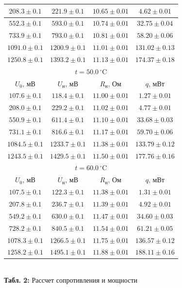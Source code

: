 \documentclass[12pt,a4paper]{scrartcl}
\begin{document}
\begin{center}
\begin{tabular}{|c|c|c|c|}
			\\\hline
			$208.3 \pm 0.1$ & $221.9 \pm 0.1$ & $10.65 \pm 0.01$ & $4.62 \pm 0.01$
			\\\hline
			$552.3 \pm 0.1$ & $593.0 \pm 0.1$ & $10.74 \pm 0.01$ & $32.75 \pm 0.04$
			\\\hline
			$733.9 \pm 0.1$ & $793.0 \pm 0.1$ & $10.81 \pm 0.01$ & $58.20 \pm 0.06$
			\\\hline
			$1091.0 \pm 0.1$ & $1200.9 \pm 0.1$ & $11.01 \pm 0.01$ & $131.02 \pm 0.13$
			\\\hline
			$1250.8 \pm 0.1$ & $1393.2 \pm 0.1$ & $11.13 \pm 0.01$ & $174.37 \pm 0.18$
			\\\hline
			\multicolumn{4}{|c|}{$t = 50.0\,^\circ$C}
			\\\hline
			$U_0$, мВ & $U_{\text{н}}$, мВ & $R_{\text{н}}$, Ом & $q$, мВт
			\\\hline
			$107.6 \pm 0.1$ & $118.4 \pm 0.1$ & $11.00 \pm 0.01$ & $1.27 \pm 0.01$
			\\\hline
			$208.0 \pm 0.1$ & $229.2 \pm 0.1$ & $11.02 \pm 0.01$ & $4.77 \pm 0.01$
			\\\hline
			$550.9 \pm 0.1$ & $611.4 \pm 0.1$ & $11.10 \pm 0.01$ & $33.68 \pm 0.03$
			\\\hline
			$731.1 \pm 0.1$ & $816.6 \pm 0.1$ & $11.17 \pm 0.01$ & $59.70 \pm 0.06$
			\\\hline
			$1084.5 \pm 0.1$ & $1233.7 \pm 0.1$ & $11.38 \pm 0.01$ & $133.79 \pm 0.12$
			\\\hline
			$1243.5 \pm 0.1$ & $1429.5 \pm 0.1$ & $11.50 \pm 0.01$ & $177.76 \pm 0.16$
			\\\hline
			\multicolumn{4}{|c|}{$t = 60.0\,^\circ$C}
			\\\hline
			$U_0$, мВ & $U_{\text{н}}$, мВ & $R_{\text{н}}$, Ом & $q$, мВт
			\\\hline
			$107.5 \pm 0.1$ & $122.3 \pm 0.1$ & $11.38 \pm 0.01$ & $1.31 \pm 0.01$
			\\\hline
			$207.8 \pm 0.1$ & $236.7 \pm 0.1$ & $11.39 \pm 0.01$ & $4.92 \pm 0.01$
			\\\hline
			$549.2 \pm 0.1$ & $630.0 \pm 0.1$ & $11.47 \pm 0.01$ & $34.60 \pm 0.03$
			\\\hline
			$728.2 \pm 0.1$ & $840.5 \pm 0.1$ & $11.54 \pm 0.01$ & $61.21 \pm 0.05$
			\\\hline
			$1078.3 \pm 0.1$ & $1266.5 \pm 0.1$ & $11.75 \pm 0.01$ & $136.57 \pm 0.12$
			\\\hline
			$1258.2 \pm 0.1$ & $1495.1 \pm 0.1$ & $11.88 \pm 0.01$ & $188.11 \pm 0.16$
			\\\hline
		\end{tabular}
		\\\textbf{Табл. 2:} Рассчет сопротивления и мощности
	\end{center}
\end{document}
